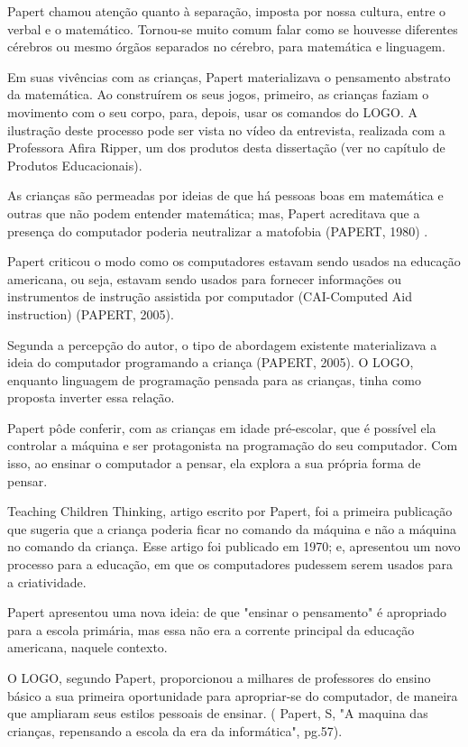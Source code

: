 Papert chamou atenção quanto à separação, imposta por nossa cultura, entre o verbal e o matemático. Tornou-se muito comum falar como se houvesse diferentes cérebros ou mesmo órgãos separados no cérebro, para matemática e linguagem.

Em suas vivências com as crianças, Papert materializava o pensamento abstrato da matemática. Ao construírem os seus jogos, primeiro, as crianças faziam o movimento com o seu corpo, para, depois, usar os comandos do LOGO. A ilustração deste processo pode ser vista no vídeo  da entrevista, realizada com a Professora Afira Ripper,  um dos produtos desta dissertação (ver no capítulo de Produtos Educacionais).

As crianças são permeadas por ideias de que há pessoas boas em matemática e outras que não podem entender matemática; mas, Papert acreditava que a presença do computador poderia neutralizar a matofobia (PAPERT, 1980) .

Papert criticou o modo como os computadores estavam sendo usados na educação americana, ou seja, estavam sendo usados para fornecer informações ou instrumentos de instrução assistida por computador (CAI-Computed Aid instruction)  (PAPERT, 2005).

Segunda a percepção do autor, o tipo de abordagem existente materializava a ideia do computador programando a criança (PAPERT, 2005). O LOGO, enquanto linguagem de programação pensada para as crianças, tinha como proposta inverter essa relação.

Papert pôde conferir, com as crianças em idade pré-escolar, que é possível ela controlar a máquina e ser protagonista na programação do seu computador. Com isso, ao ensinar o computador a pensar, ela explora a sua própria forma de pensar.

Teaching Children Thinking, artigo escrito por Papert, foi a primeira publicação que sugeria que a criança poderia ficar no comando da máquina e não a máquina no comando da criança.  Esse artigo  foi publicado em 1970; e,  apresentou um novo processo para a educação, em que os computadores pudessem serem usados para a criatividade.

Papert apresentou uma nova ideia: de que "ensinar o pensamento"  é apropriado para a escola primária, mas essa não era a corrente principal da educação americana, naquele contexto.

O LOGO, segundo Papert, proporcionou a milhares de professores do ensino básico a sua primeira oportunidade para apropriar-se do computador, de maneira que ampliaram seus estilos pessoais de ensinar. ( Papert, S, "A maquina das crianças, repensando a escola da era da informática", pg.57).

